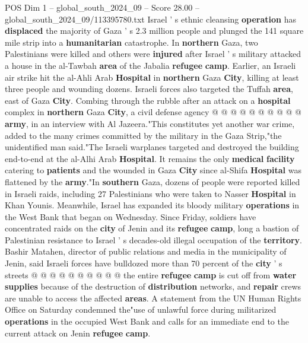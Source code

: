 \begin{textsample}{POS Dim 1 – global\_south\_2024\_09 – Score 28.00 – global\_south\_2024\_09/113395780.txt}
Israel ' s ethnic cleansing \textbf{operation} has \textbf{displaced} the majority of Gaza ' s 2.3 million people and plunged the 141 square mile strip into a \textbf{humanitarian} catastrophe.
In \textbf{northern} Gaza, two Palestinians were killed and others were \textbf{injured} after Israel ' s military attacked a house in the al-Tawbah \textbf{area} of the Jabalia \textbf{refugee} \textbf{camp}.
Earlier, an Israeli air strike hit the al-Ahli Arab \textbf{Hospital} in \textbf{northern} Gaza \textbf{City}, killing at least three people and wounding dozens.
Israeli forces also targeted the Tuffah \textbf{area}, east of Gaza \textbf{City}.
Combing through the rubble after an attack on a \textbf{hospital} complex in \textbf{northern} Gaza \textbf{City}, a civil defense agency @ @ @ @ @ @ @ @ @ @ \textbf{army}, in an interview with Al Jazeera."This constitutes yet another war crime, added to the many crimes committed by the military in the Gaza Strip,"the unidentified man said."The Israeli warplanes targeted and destroyed the building end-to-end at the al-Alhi Arab \textbf{Hospital}.
It remains the only \textbf{medical} \textbf{facility} catering to \textbf{patients} and the wounded in Gaza \textbf{City} since al-Shifa \textbf{Hospital} was flattened by the \textbf{army}."In \textbf{southern} Gaza, dozens of people were reported killed in Israeli raids, including 27 Palestinians who were taken to Nasser \textbf{Hospital} in Khan Younis.
Meanwhile, Israel has expanded its bloody military \textbf{operations} in the West Bank that began on Wednesday.
Since Friday, soldiers have concentrated raids on the \textbf{city} of Jenin and its \textbf{refugee} \textbf{camp}, long a bastion of Palestinian resistance to Israel ' s decades-old illegal occupation of the \textbf{territory}.
Bashir Matahen, director of public relations and media in the municipality of Jenin, said Israeli forces have bulldozed more than 70 percent of the \textbf{city} ' s streets @ @ @ @ @ @ @ @ @ @ the entire \textbf{refugee} \textbf{camp} is cut off from \textbf{water} \textbf{supplies} because of the destruction of \textbf{distribution} networks, and \textbf{repair} crews are unable to access the affected \textbf{areas}.
A statement from the UN Human Rights Office on Saturday condemned the"use of unlawful force during militarized \textbf{operations} in the occupied West Bank and calls for an immediate end to the current attack on Jenin \textbf{refugee} \textbf{camp}.

\end{textsample}
